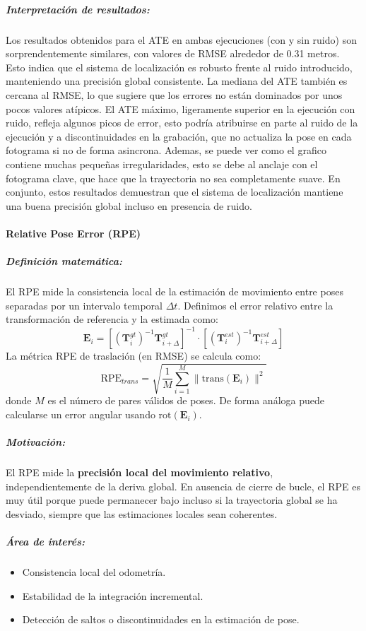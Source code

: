 \documentclass[12pt, a4paper, twoside]{article}
\begin{document}
\subparagraph{Interpretación de resultados:}
Los resultados obtenidos para el ATE en ambas ejecuciones (con y sin ruido) son
sorprendentemente similares, con valores de RMSE alrededor de 0.31 metros.
Esto indica que el sistema de localización es robusto frente al ruido introducido,
manteniendo una precisión global consistente.\newline
La mediana del ATE también es cercana al RMSE, lo que sugiere que
los errores no están dominados por unos pocos valores atípicos.
El ATE máximo, ligeramente superior en la ejecución con ruido, refleja
algunos picos de error, esto podría atribuirse en parte al ruido de la ejecución y 
a discontinuidades en la grabación, que no actualiza la pose en cada fotograma si no
de forma asincrona.\newline
Ademas, se puede ver como el grafico contiene muchas pequeñas irregularidades, esto se 
debe al anclaje con el fotograma clave, que hace que la trayectoria no sea completamente suave.
En conjunto, estos resultados demuestran que el sistema de localización
mantiene una buena precisión global incluso en presencia de ruido.

\paragraph{Relative Pose Error (RPE)}

\subparagraph{Definición matemática:}
El RPE mide la consistencia local de la estimación de movimiento entre poses 
separadas por un intervalo temporal $\Delta t$.
Definimos el error relativo entre la transformación de referencia y la estimada como:
\[
\mathbf{E}_i =
\left[
(\mathbf{T}^{gt}_i)^{-1}\mathbf{T}^{gt}_{i+\Delta}
\right]^{-1}
\cdot
\left[
(\mathbf{T}^{est}_i)^{-1}\mathbf{T}^{est}_{i+\Delta}
\right]
\]
La métrica RPE de traslación (en RMSE) se calcula como:
\[
\text{RPE}_{trans} =
\sqrt{\frac{1}{M}\sum_{i=1}^{M}
\|\mathrm{trans}(\mathbf{E}_i)\|^2 }
\]
donde $M$ es el número de pares válidos de poses.
De forma análoga puede calcularse un error angular usando $\mathrm{rot}(\mathbf{E}_i)$.

\subparagraph{Motivación:}
El RPE mide la \textbf{precisión local del movimiento relativo}, 
independientemente de la deriva global.
En ausencia de cierre de bucle, el RPE es muy útil porque 
puede permanecer bajo incluso si la trayectoria global se ha desviado,
siempre que las estimaciones locales sean coherentes.

\subparagraph{Área de interés:}
\begin{itemize}
  \item Consistencia local del odometría.
  \item Estabilidad de la integración incremental.
  \item Detección de saltos o discontinuidades en la estimación de pose.
\end{itemize}
\end{document}
